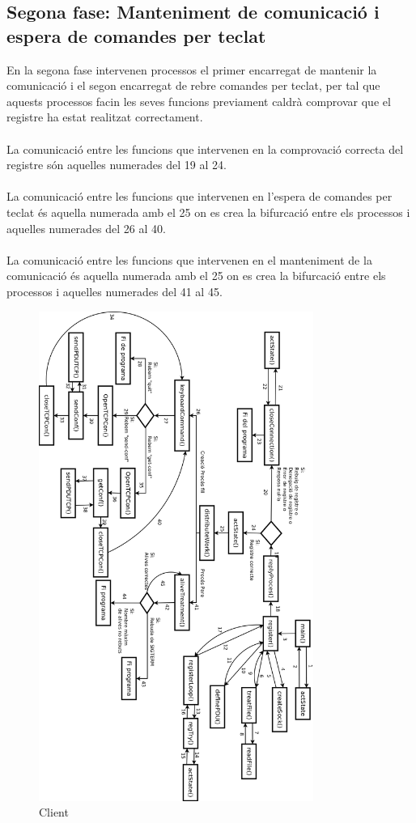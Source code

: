 \documentclass[11pt]{article}
\begin{document}
\subsection*{Segona fase: Manteniment de comunicació i espera de comandes per teclat}
En la segona fase intervenen processos el primer encarregat de mantenir la comunicació i el segon encarregat de rebre comandes per teclat, per tal que aquests processos facin les seves funcions previament caldrà comprovar que el registre ha estat realitzat correctament.\\\\
La comunicació entre les funcions que intervenen en la comprovació correcta del registre són aquelles numerades del 19 al 24.\\\\
La comunicació entre les funcions que intervenen en l'espera de comandes per teclat és aquella numerada amb el 25 on es crea la bifurcació entre els processos i aquelles numerades del 26 al 40.\\\\
La comunicació entre les funcions que intervenen en el manteniment de la comunicació és aquella numerada amb el 25 on es crea la bifurcació entre els processos i aquelles numerades del 41 al 45.
\afterpage{\clearpage}
\begin{figure}[h]
    \includegraphics[width=0.8\textwidth]{Client.png}
    \caption{Client}
    \label{fig:Client}

\end{figure}
\newpage
\end{document}
